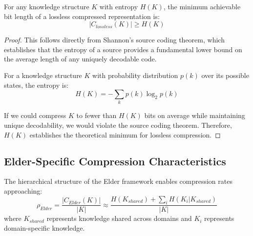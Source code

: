 \begin{theorem}
For any knowledge structure $K$ with entropy $H(K)$, the minimum achievable bit length of a lossless compressed representation is:
\begin{equation}
|C_{lossless}(K)| \geq H(K)
\end{equation}
\end{theorem}

\begin{proof}
This follows directly from Shannon's source coding theorem, which establishes that the entropy of a source provides a fundamental lower bound on the average length of any uniquely decodable code.

For a knowledge structure $K$ with probability distribution $p(k)$ over its possible states, the entropy is:
\begin{equation}
H(K) = -\sum_k p(k) \log_2 p(k)
\end{equation}

If we could compress $K$ to fewer than $H(K)$ bits on average while maintaining unique decodability, we would violate the source coding theorem. Therefore, $H(K)$ establishes the theoretical minimum for lossless compression.
\end{proof}

\subsection{Elder-Specific Compression Characteristics}

\begin{theorem}
The hierarchical structure of the Elder framework enables compression rates approaching:
\begin{equation}
\rho_{Elder} = \frac{|C_{Elder}(K)|}{|K|} \approx \frac{H(K_{shared}) + \sum_i H(K_i | K_{shared})}{|K|}
\end{equation}
where $K_{shared}$ represents knowledge shared across domains and $K_i$ represents domain-specific knowledge.
\end{theorem}

